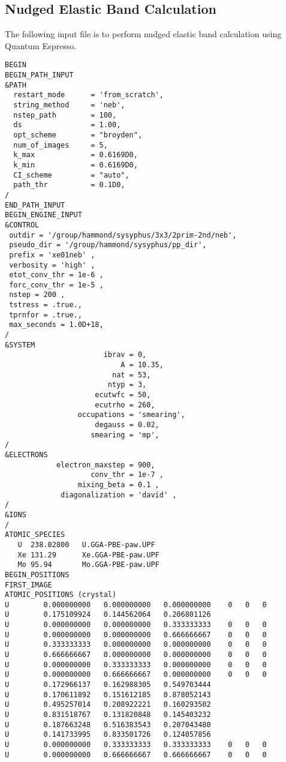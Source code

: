 \subsection{Nudged Elastic Band Calculation}
The following input file is to perform nudged elastic band calculation using Quantum Espresso.
\lstset{style=atpw}
\begin{lstlisting}
BEGIN
BEGIN_PATH_INPUT
&PATH
  restart_mode      = 'from_scratch',
  string_method     = 'neb',
  nstep_path        = 100,
  ds                = 1.00,
  opt_scheme        = "broyden",
  num_of_images     = 5,
  k_max             = 0.6169D0,
  k_min             = 0.6169D0,
  CI_scheme         = "auto",
  path_thr          = 0.1D0,
/
END_PATH_INPUT
BEGIN_ENGINE_INPUT
&CONTROL
 outdir = '/group/hammond/sysyphus/3x3/2prim-2nd/neb',
 pseudo_dir = '/group/hammond/sysyphus/pp_dir',
 prefix = 'xe01neb' ,
 verbosity = 'high' ,
 etot_conv_thr = 1e-6 ,
 forc_conv_thr = 1e-5 ,
 nstep = 200 ,
 tstress = .true.,
 tprnfor = .true.,
 max_seconds = 1.0D+18,
/
&SYSTEM
                       ibrav = 0,
                           A = 10.35,
                         nat = 53, 
                        ntyp = 3,
                     ecutwfc = 50, 
                     ecutrho = 260,
                 occupations = 'smearing',
                     degauss = 0.02,
                    smearing = 'mp',
/
&ELECTRONS
            electron_maxstep = 900,
                    conv_thr = 1e-7 ,
                 mixing_beta = 0.1 ,
             diagonalization = 'david' ,
/
&IONS
/
ATOMIC_SPECIES
   U  238.02800   U.GGA-PBE-paw.UPF
   Xe 131.29      Xe.GGA-PBE-paw.UPF
   Mo 95.94       Mo.GGA-PBE-paw.UPF
BEGIN_POSITIONS
FIRST_IMAGE
ATOMIC_POSITIONS (crystal)
U        0.000000000   0.000000000   0.000000000    0   0   0
U        0.175109924   0.144562064   0.206801126
U        0.000000000   0.000000000   0.333333333    0   0   0
U        0.000000000   0.000000000   0.666666667    0   0   0
U        0.333333333   0.000000000   0.000000000    0   0   0
U        0.666666667   0.000000000   0.000000000    0   0   0
U        0.000000000   0.333333333   0.000000000    0   0   0
U        0.000000000   0.666666667   0.000000000    0   0   0
U        0.172966137   0.162988305   0.549703444
U        0.170611892   0.151612185   0.878052143
U        0.495257014   0.208922221   0.160293502
U        0.831518767   0.131820848   0.145403232
U        0.187663248   0.516383543   0.207043480
U        0.141733995   0.833501726   0.124057856
U        0.000000000   0.333333333   0.333333333    0   0   0
U        0.000000000   0.666666667   0.666666667    0   0   0

\end{lstlisting}
